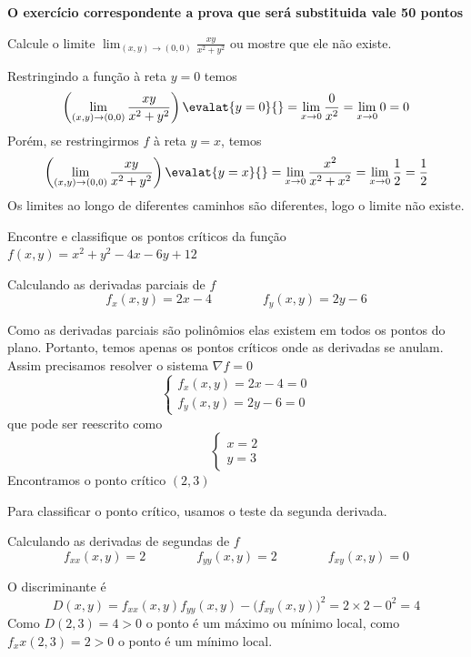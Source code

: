\documentclass[a4paper,12pt,fleqn]{article}
\begin{document}

\textbf{O exercício correspondente a prova que será substituida vale 50 pontos}

Calcule o limite
\(
  \lim_{(x, y) \to (0, 0)} \frac{xy}{x^2 + y^2}
\)
ou mostre que ele não existe.

\begin{answer}
  Restringindo a função à reta \( y = 0 \) temos
  \[
    \left(\lim_{(x, y) \to (0, 0)} \frac{xy}{x^2 + y^2}\right)  \evalat{y=0}{}
    = \lim_{x\to 0} \frac{0}{x^2}
    = \lim_{x\to 0} 0
    = 0
  \]
  Porém, se restringirmos $f$ à reta \( y=x\), temos
  \[
    \left(\lim_{(x, y) \to (0, 0)} \frac{xy}{x^2 + y^2}\right) \evalat{y=x}{}
    = \lim_{x\to 0} \frac{x^2}{x^2+x^2}
    = \lim_{x\to 0} \frac{1}{2}
    = \frac{1}{2}
  \]
  Os limites ao longo de diferentes caminhos são diferentes, logo o limite não existe.
  \clearpage
\end{answer}

Encontre e classifique os pontos críticos da função
\(
  f(x, y) = x^2 + y^2 - 4x - 6y + 12
\)

\begin{answer}
  Calculando as derivadas parciais de $f$
  \[
    f_x(x, y) = 2x - 4 \qquad\qquad f_y(x, y) = 2y - 6
  \]

  Como as derivadas parciais são polinômios elas existem em todos os pontos
  do plano. Portanto, temos apenas os pontos críticos onde as derivadas se anulam.
  Assim precisamos resolver o sistema \(\nabla f = 0\)
  \[
    \begin{cases}
      f_x(x, y) = 2x - 4 = 0 \\
      f_y(x, y) = 2y - 6 = 0
    \end{cases}
  \]
  que pode ser reescrito como
  \[
    \begin{cases}
      x = 2 \\
      y = 3
    \end{cases}
  \]
  Encontramos o ponto crítico \((2, 3)\)

  Para classificar o ponto crítico, usamos o teste da segunda derivada.

  Calculando as derivadas de segundas de $f$
  \[
    f_{xx}(x, y) = 2 \qquad\qquad
    f_{yy}(x, y) = 2 \qquad\qquad
    f_{xy}(x, y) = 0
  \]

  O discriminante é
  \[
    D(x, y) = f_{xx}(x, y)f_{yy}(x, y) - \big(f_{xy}(x, y)\big)^2
    = 2 \times 2 - 0^2
    = 4
  \]
  Como \(D(2, 3) = 4 >0\) o ponto é um máximo ou mínimo local,
  como \( f_xx(2, 3) = 2 > 0 \) o ponto é um mínimo local.
\clearpage
\end{answer}
\end{document}
